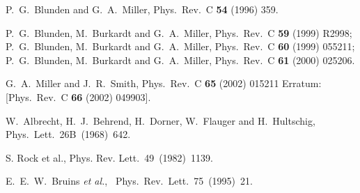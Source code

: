 \documentclass[preprint,aps,showpacs,floatfix]{revtex4}
\begin{document}
\begin{thebibliography}{99}
  P.~G.~Blunden and G.~A.~Miller,
  Phys.\ Rev.\ C {\bf 54} (1996) 359. 


  P.~G.~Blunden, M.~Burkardt and G.~A.~Miller,
  Phys.\ Rev.\ C {\bf 59} (1999) R2998;\\
 P.~G.~Blunden, M.~Burkardt and G.~A.~Miller,
  Phys.\ Rev.\ C {\bf 60} (1999) 055211;\\
  P.~G.~Blunden, M.~Burkardt and G.~A.~Miller,
  Phys.\ Rev.\ C {\bf 61} (2000) 025206.
  
  G.~A.~Miller and J.~R.~Smith,
  Phys.\ Rev.\ C {\bf 65} (2002) 015211
   Erratum: [Phys.\ Rev.\ C {\bf 66} (2002) 049903].


  
  
  W.~Albrecht, H.~J.~Behrend, H.~Dorner, W.~Flauger and H.~Hultschig,
  Phys.\ Lett.~26B~(1968)~642.   %
  
S. Rock et al., Phys. Rev. Lett.~49~(1982)~1139.

 E.~E.~W.~Bruins {\it et al.},   
~Phys.~Rev.~Lett.~75~(1995)~21. %



\end{thebibliography}
\end{document}
